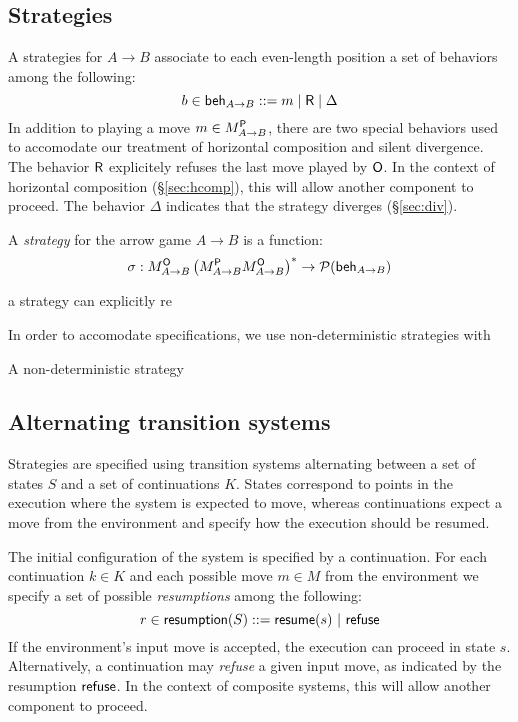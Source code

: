 \subsection{Strategies}

A strategies for $A \rightarrow B$
associate to each even-length position
a set of behaviors among the following:
\[
    b \in  \mathsf{beh} _{A \rightarrow B} ::= m \mid  \mathsf{R}  \mid \Delta
\]
In addition to playing a move $m \in M_{A \rightarrow B}^{ \mathsf{P} }$,
there are two special behaviors
used to accomodate our treatment of
horizontal composition and silent divergence.
The behavior $ \mathsf{R} $ explicitely refuses the last move played by $ \mathsf{O} $.
In the context of horizontal composition (\S\ref{sec:hcomp}),
this will allow another component to proceed.
The behavior $\Delta$ indicates that the strategy diverges (\S\ref{sec:div}).

\begin{definition}
A \emph{strategy} for the arrow game $A \rightarrow B$
is a function:
\[
    \sigma :
      M_{A \rightarrow B}^{ \mathsf{O} }
      \left( M_{A \rightarrow B}^{ \mathsf{P} } M_{A \rightarrow B}^{ \mathsf{O} } \right)^*
      \rightarrow
      \mathcal{P}( \mathsf{beh} _{A \rightarrow B})
\]
\end{definition}


a strategy can explicitly re


In order to accomodate specifications,
we use non-deterministic strategies with 

A non-deterministic strategy 


\subsection{Alternating transition systems}

Strategies are specified using transition systems
alternating between a set of states $S$ and
a set of continuations $K$.
States correspond to points in the execution
where the system is expected to move,
whereas continuations expect a move from the environment
and specify how the execution should be resumed.

The initial configuration of the system
is specified by a continuation.
For each continuation $k \in K$
and each possible move $m \in M$ from the environment
we specify a set of possible \emph{resumptions}
among the following:
\[ r \in  \mathsf{resumption} (S) ::=
	 \mathsf{resume} (s) \ |\  \mathsf{refuse}  \]
If the environment's input move is accepted,
the execution can proceed in state $s$.
Alternatively,
a continuation may \emph{refuse} a given input move,
as indicated by the resumption $ \mathsf{refuse} $.
In the context of composite systems,
this will allow another component to proceed.

